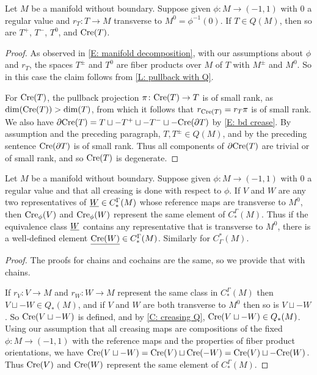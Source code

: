 \begin{corollary}\label{C: creasing Q}
	Let $M$ be a manifold without boundary.
	Suppose given $\phi \colon M \to (-1,1)$ with $0$ a regular value and $r_T \colon T \to M$ transverse to $M^0 = \phi^{-1}(0)$.
	If $T \in Q(M)$, then so are $T^+$, $T^-$, $T^0$, and $\mathrm{Cre}(T)$.
\end{corollary}

\begin{proof}
	As observed in \cref{E: manifold decomposition}, with our assumptions about $\phi$ and $r_T$, the spaces $T^\pm$ and $T^0$ are fiber products over $M$ of $T$ with $M^\pm$ and $M^0$.
	So in this case the claim follows from \cref{L: pullback with Q}.

	For $\mathrm{Cre}(T)$, the pullback projection $\pi \colon \mathrm{Cre}(T) \to T$ is of small rank, as $\dim(\mathrm{Cre}(T))>\dim(T)$, from which it follows that $r_{\mathrm{Cre}(T)} = r_T\pi$ is of small rank.
	We also have $\partial \mathrm{Cre}(T) = T \sqcup - T^+ \sqcup -T^- \sqcup -\mathrm{Cre}(\partial T)$ by \cref{E: bd crease}.
	By assumption and the preceding paragraph, $T, T^\pm \in Q(M)$, and by the preceding sentence $\mathrm{Cre}(\partial T)$ is of small rank.
	Thus all components of $\partial \mathrm{Cre}(T)$ are trivial or of small rank, and so $\mathrm{Cre}(T)$ is degenerate.
\end{proof}

\begin{proposition}
	Let $M$ be a manifold without boundary.
	Suppose given $\phi \colon M \to (-1,1)$ with $0$ a regular value and that all creasing is done with respect to $\phi$.
	If $V$ and $W$ are any two representatives of $\underline{W} \in C_*^\Gamma(M)$ whose reference maps are transverse to $M^0$, then $\mathrm{Cre}_\phi(V)$ and $\mathrm{Cre}_\phi(W)$ represent the same element of $C_*^\Gamma(M)$.
	Thus if the equivalence class $\underline{W}$ contains any representative that is transverse to $M^0$, there is a well-defined element $\underline{\mathrm{Cre}(W)} \in C_*^\Gamma(M)$.
	Similarly for $C^*_\Gamma(M)$.
\end{proposition}

\begin{proof}
	The proofs for chains and cochains are the same, so we provide that with chains.

	If $r_V \colon V \to M$ and $r_W \colon W \to M$ represent the same class in $C_*^\Gamma(M)$ then $V \sqcup -W \in Q_*(M)$, and if $V$ and $W$ are both transverse to $M^0$ then so is $V \sqcup -W$.
	So $\mathrm{Cre}(V\sqcup-W)$ is defined, and by \cref{C: creasing Q}, $\mathrm{Cre}(V \sqcup -W) \in Q_*(M)$.
	Using our assumption that all creasing maps are compositions of the fixed $\phi \colon M \to (-1,1)$ with the reference maps and the properties of fiber product orientations, we have $\mathrm{Cre}(V \sqcup -W) = \mathrm{Cre}(V) \sqcup \mathrm{Cre}(-W) = \mathrm{Cre}(V) \sqcup -\mathrm{Cre}(W)$.
	Thus $\mathrm{Cre}(V)$ and $\mathrm{Cre}(W)$ represent the same element of $C_*^\Gamma(M)$.
\end{proof}


